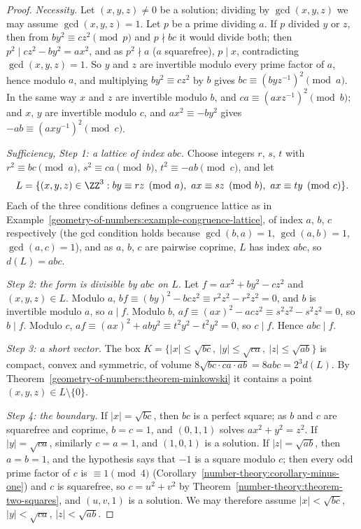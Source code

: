 \begin{proof}
\emph{Necessity.} Let $(x, y, z) \neq 0$ be a solution; dividing by $\gcd(x, y, z)$ we may assume $\gcd(x, y, z) = 1$. Let $p$ be a prime dividing $a$. If $p$ divided $y$ or $z$, then from
$by^2 \equiv cz^2 \pmod p$ and $p \nmid bc$ it would divide both; then $p^2 \mid cz^2 - by^2 = ax^2$, and as $p^2 \nmid a$ ($a$ squarefree), $p \mid x$, contradicting $\gcd(x, y, z) = 1$. So
$y$ and $z$ are invertible modulo every prime factor of $a$, hence modulo $a$, and multiplying $by^2 \equiv cz^2$ by $b$ gives $bc \equiv (byz^{-1})^2 \pmod a$. In the same way $x$ and $z$ are invertible
modulo $b$, and $ca \equiv (axz^{-1})^2 \pmod b$; and $x$, $y$ are invertible modulo $c$, and $ax^2 \equiv -by^2$ gives $-ab \equiv (axy^{-1})^2 \pmod c$.

\emph{Sufficiency, Step 1: a lattice of index $abc$.} Choose integers $r$, $s$, $t$ with $r^2 \equiv bc \pmod a$, $s^2 \equiv ca \pmod b$, $t^2 \equiv -ab \pmod c$, and let
\[
L = \{(x, y, z) \in \ZZ^3 : by \equiv rz \pmod a, \ ax \equiv sz \pmod b, \ ax \equiv ty \pmod c\}.
\]
Each of the three conditions defines a congruence lattice as in Example~\ref{geometry-of-numbers:example-congruence-lattice}, of index $a$, $b$, $c$ respectively (the gcd condition holds because
$\gcd(b, a) = 1$, $\gcd(a, b) = 1$, $\gcd(a, c) = 1$), and as $a$, $b$, $c$ are pairwise coprime, $L$ has index $abc$, so $d(L) = abc$.

\emph{Step 2: the form is divisible by $abc$ on $L$.} Let $f = ax^2 + by^2 - cz^2$ and $(x, y, z) \in L$. Modulo $a$, $bf \equiv (by)^2 - bcz^2 \equiv r^2z^2 - r^2z^2 = 0$, and $b$ is invertible modulo $a$,
so $a \mid f$. Modulo $b$, $af \equiv (ax)^2 - acz^2 \equiv s^2z^2 - s^2z^2 = 0$, so $b \mid f$. Modulo $c$, $af \equiv (ax)^2 + aby^2 \equiv t^2y^2 - t^2y^2 = 0$, so $c \mid f$. Hence $abc \mid f$.

\emph{Step 3: a short vector.} The box $K = \{|x| \leq \sqrt{bc}, \ |y| \leq \sqrt{ca}, \ |z| \leq \sqrt{ab}\}$ is compact, convex and symmetric, of volume $8\sqrt{bc \cdot ca \cdot ab} = 8abc = 2^3d(L)$. By
Theorem~\ref{geometry-of-numbers:theorem-minkowski} it contains a point $(x, y, z) \in L \setminus \{0\}$.

\emph{Step 4: the boundary.} If $|x| = \sqrt{bc}$, then $bc$ is a perfect square; as $b$ and $c$ are squarefree and coprime, $b = c = 1$, and $(0, 1, 1)$ solves $ax^2 + y^2 = z^2$. If $|y| = \sqrt{ca}$,
similarly $c = a = 1$, and $(1, 0, 1)$ is a solution. If $|z| = \sqrt{ab}$, then $a = b = 1$, and the hypothesis says that $-1$ is a square modulo $c$; then every odd prime factor of $c$ is $\equiv 1 \pmod 4$
(Corollary~\ref{number-theory:corollary-minus-one}) and $c$ is squarefree, so $c = u^2 + v^2$ by Theorem~\ref{number-theory:theorem-two-squares}, and $(u, v, 1)$ is a solution. We may therefore assume
$|x| < \sqrt{bc}$, $|y| < \sqrt{ca}$, $|z| < \sqrt{ab}$.


\end{proof}
